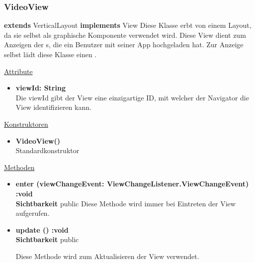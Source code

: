 \newpage
\subsubsection{VideoView}\label{VideoView}
\textbf{extends}  VerticalLayout \newline
\textbf{implements} View \newline
Diese Klasse erbt von einem Layout, da sie selbst als graphische Komponente verwendet wird. Diese View dient zum Anzeigen der s, die ein Benutzer mit seiner App hochgeladen hat. Zur Anzeige selbst lädt diese Klasse einen .
\newline

\underline{Attribute}
\begin{itemize}
\itemsep0pt
\item \textbf{viewId: String} \hfill\\ 
Die viewId gibt der View eine einzigartige ID, mit welcher der Navigator die View identifizieren kann.

\end{itemize}

\underline{Konstruktoren}
\begin{itemize}
\itemsep0pt
\item \textbf{VideoView()} \hfill\\
Standardkonstruktor
\end{itemize}

\underline{Methoden}
\begin{itemize}
\itemsep0pt
\item \textbf{enter (viewChangeEvent: ViewChangeListener.ViewChangeEvent) :void}\hfill\\
\textbf{Sichtbarkeit} public
Diese Methode wird immer bei Eintreten der View aufgerufen.

\item \textbf{update () :void}\hfill\\
\textbf{Sichtbarkeit} public

Diese Methode wird zum Aktualisieren der View verwendet.

\end{itemize}
